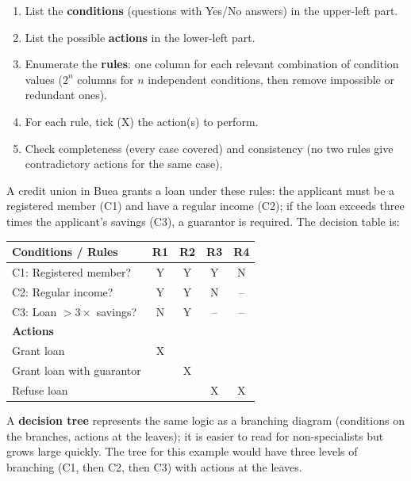 \documentclass[11pt]{article}
\begin{document}
\begin{methode}
\begin{enumerate}
\item List the \textbf{conditions} (questions with Yes/No answers) in the upper-left part.
\item List the possible \textbf{actions} in the lower-left part.
\item Enumerate the \textbf{rules}: one column for each relevant combination of condition values ($2^n$ columns for $n$ independent conditions, then remove impossible or redundant ones).
\item For each rule, tick (X) the action(s) to perform.
\item Check completeness (every case covered) and consistency (no two rules give contradictory actions for the same case).
\end{enumerate}
\end{methode}

\begin{exemplebox}
A credit union in Buea grants a loan under these rules: the applicant must be a registered member (C1) and have a regular income (C2); if the loan exceeds three times the applicant's savings (C3), a guarantor is required. The decision table is:
\begin{center}
\begin{tabular}{|l|c|c|c|c|}
\hline
\rowcolor{popblueL} \textbf{Conditions / Rules} & \textbf{R1} & \textbf{R2} & \textbf{R3} & \textbf{R4} \\
\hline
C1: Registered member? & Y & Y & Y & N \\
\hline
C2: Regular income? & Y & Y & N & -- \\
\hline
C3: Loan $> 3\times$ savings? & N & Y & -- & -- \\
\hline
\rowcolor{popblueL} \textbf{Actions} & & & & \\
\hline
Grant loan & X & & & \\
\hline
Grant loan with guarantor & & X & & \\
\hline
Refuse loan & & & X & X \\
\hline
\end{tabular}
\end{center}
A \textbf{decision tree} represents the same logic as a branching diagram (conditions on the branches, actions at the leaves); it is easier to read for non-specialists but grows large quickly. The tree for this example would have three levels of branching (C1, then C2, then C3) with actions at the leaves.
\end{exemplebox}
\end{document}
